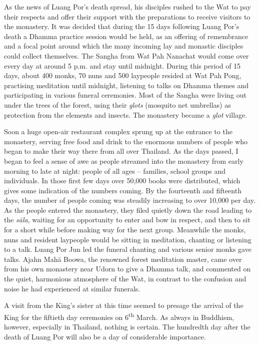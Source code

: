 As the news of Luang Por's death spread, his disciples rushed to the Wat
to pay their respects and offer their support with the preparations to
receive visitors to the monastery. It was decided that during the 15
days following Luang Por's death a Dhamma practice session would be
held, as an offering of remembrance and a focal point around which the
many incoming lay and monastic disciples could collect themselves. The
Sangha from Wat Pah Nanachat would come over every day at around 5 p.m.
and stay until midnight. During this period of 15 days, about 400 monks, 
70 nuns and 500 laypeople resided at Wat Pah Pong, practising
meditation until midnight, listening to talks on Dhamma themes and
participating in various funeral ceremonies. Most of the Sangha were
living out under the trees of the forest, using their \emph{glots}
 (mosquito net umbrellas) as protection from the elements and insects. 
The monastery became a \emph{glot} village. 

Soon a huge open-air restaurant complex sprung up at the entrance to the
monastery, serving free food and drink to the enormous numbers of people
who began to make their way there from all over Thailand. As the days
passed, I began to feel a sense of awe as people streamed into the
monastery from early morning to late at night: people of all ages --
families, school groups and individuals. In those first few days over
50,000 books were distributed, which gives some indication of the
numbers coming. By the fourteenth and fifteenth days, the number of
people coming was steadily increasing to over 10,000 per day. As the
people entered the monastery, they filed quietly down the road leading
to the \emph{sāla}, waiting for an opportunity to enter and bow in
respect, and then to sit for a short while before making way for the
next group. Meanwhile the monks, nuns and resident laypeople would be
sitting in meditation, chanting or listening to a talk. Luang Por Jun
led the funeral chanting and various senior monks gave talks. Ajahn Mahā
Boowa, the renowned forest meditation master, came over from his own
monastery near Udorn to give a Dhamma talk, and commented on the quiet, 
harmonious atmosphere of the Wat, in contrast to the confusion and noise
he had experienced at similar funerals. 

A visit from the King's sister at this time seemed to presage the
arrival of the King for the fiftieth day ceremonies on 6\textsuperscript{th} March. As
always in Buddhism, however, especially in Thailand, nothing is certain. 
The hundredth day after the death of Luang Por will also be a day of
considerable importance. 

